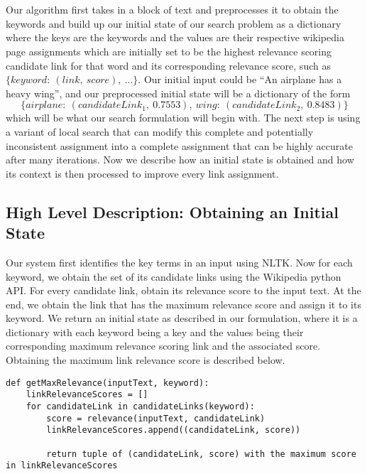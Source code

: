 \documentclass[twoside,11pt]{article}
\begin{document}
\\ \\
Our algorithm first takes in a block of text and preprocesses it to obtain the keywords and build up our initial state of our search problem as a dictionary where the keys are the keywords and the values are their respective wikipedia page assignments which are initially set to be the highest relevance scoring candidate link for that word and its corresponding relevance score, such as $\{keyword: \ (link, \ score), \ ...\}$. Our initial input could be ``An airplane has a heavy wing'', and our preprocessed initial state will be a dictionary of the form $$\{airplane: \ (candidateLink_1, \ 0.7553), \ wing: \ (candidateLink_2,  \ 0.8483)\}$$
which will be what our search formulation will begin with. The next step is using a variant of local search that can modify this complete and potentially inconsistent assignment into a complete assignment that can be highly accurate after many iterations. Now we describe how an initial state is obtained and how its context is then processed to improve every link assignment.



\subsection{High Level Description: Obtaining an Initial State}
Our system first identifies the key terms in an input using NLTK. Now for each keyword, we obtain the set of its candidate links using the Wikipedia python API. For every candidate link, obtain its relevance score to the input text. At the end, we obtain the link that has the maximum relevance score and assign it to its keyword. We return an initial state as described in our formulation, where it is a dictionary with each keyword being a key and the values being their corresponding maximum relevance scoring link and the associated score. Obtaining the maximum link relevance score is described below.

\begin{lstlisting}
def getMaxRelevance(inputText, keyword):
    linkRelevanceScores = []
    for candidateLink in candidateLinks(keyword):
        score = relevance(inputText, candidateLink)
        linkRelevanceScores.append((candidateLink, score))

        return tuple of (candidateLink, score) with the maximum score in linkRelevanceScores

\end{lstlisting}
\end{document}
